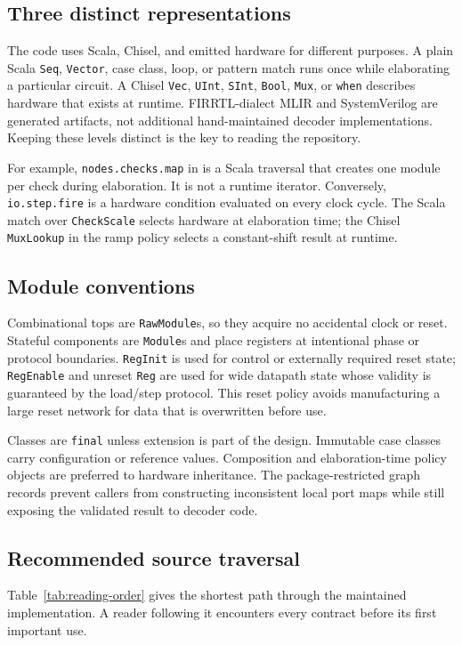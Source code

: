 \documentclass[10pt,conference]{IEEEtran}
\begin{document}
\subsection{Three distinct representations}
The code uses Scala, Chisel, and emitted hardware for different purposes.  A
plain Scala \texttt{Seq}, \texttt{Vector}, case class, loop, or pattern match
runs once while elaborating a particular circuit.  A Chisel \texttt{Vec},
\texttt{UInt}, \texttt{SInt}, \texttt{Bool}, \texttt{Mux}, or \texttt{when}
describes hardware that exists at runtime.  FIRRTL-dialect MLIR and
SystemVerilog are generated artifacts, not additional hand-maintained decoder
implementations.  Keeping these levels distinct is the key to reading the
repository.

For example, \texttt{nodes.checks.map} in
 is a Scala traversal that creates one module
per check during elaboration.  It is not a runtime iterator.  Conversely,
\texttt{io.step.fire} is a hardware condition evaluated on every clock cycle.
The Scala match over \texttt{CheckScale} selects hardware at elaboration time;
the Chisel \texttt{MuxLookup} in the ramp policy selects a constant-shift result
at runtime.

\subsection{Module conventions}
Combinational tops are \texttt{RawModule}s, so they acquire no accidental
clock or reset.  Stateful components are \texttt{Module}s and place registers
at intentional phase or protocol boundaries.  \texttt{RegInit} is used for
control or externally required reset state; \texttt{RegEnable} and unreset
\texttt{Reg} are used for wide datapath state whose validity is guaranteed by
the load/step protocol.  This reset policy avoids manufacturing a large reset
network for data that is overwritten before use.

Classes are \texttt{final} unless extension is part of the design.  Immutable
case classes carry configuration or reference values.  Composition and
elaboration-time policy objects are preferred to hardware inheritance.  The
package-restricted graph records prevent callers from constructing inconsistent
local port maps while still exposing the validated result to decoder code.

\subsection{Recommended source traversal}
Table~\ref{tab:reading-order} gives the shortest path through the maintained
implementation.  A reader following it encounters every contract before its
first important use.
\end{document}
